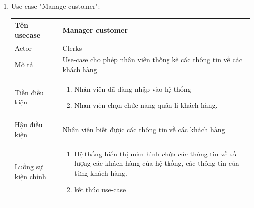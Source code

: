 \begin{enumerate}
    \item Use-case "Manage customer":
    \begin{center}{\color{black}}
        \begin{tabular}{|p{5cm}|p{7cm}|} \hline
            Tên usecase & Manager customer\\ \hline
            Actor& Clerks \\ \hline
            Mô tả& Use-case cho phép nhân viên thống kê các thông tin về các khách hàng \\ \hline
            Tiền điều kiện &
            \begin{enumerate}[1.]
                \item Nhân viên đã đăng nhập vào hệ thống
                \item Nhân viên chọn chức năng quản lí khách hàng.
            \end{enumerate}\\ \hline
            Hậu điều kiện & Nhân viên biết được các thông tin về các khách hàng \\ \hline
            Luồng sự kiện chính &  
                \begin{enumerate}[1.]
                    \item Hệ thống hiển thị màn hình chứa các thông tin về số lượng các khách hàng của hệ thống, các thông tin của từng khách hàng.
    				\item kết thúc use-case
                \end{enumerate} \\\hline
        \end{tabular}
    \end{center}
    

\end{enumerate}
